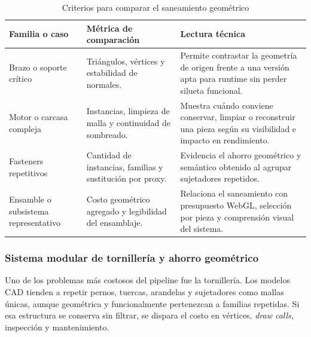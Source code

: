 \begin{table}[p]
    \caption{Criterios para comparar el saneamiento geométrico}
    \label{tab:comparativa_saneamiento_geometrico_cap4}
    \centering
    \footnotesize
    \setlength{\tabcolsep}{3pt}
    \renewcommand{\arraystretch}{0.86}
    \begin{tabular}{>{\RaggedRight\arraybackslash}p{3.2cm}>{\RaggedRight\arraybackslash}p{3.6cm}>{\RaggedRight\arraybackslash}p{6.5cm}}
        \hline
        \textbf{Familia o caso} & \textbf{Métrica de comparación} & \textbf{Lectura técnica} \\ \hline
        Brazo o soporte crítico & Triángulos, vértices y estabilidad de normales. & Permite contrastar la geometría de origen frente a una versión apta para runtime sin perder silueta funcional. \\
        Motor o carcasa compleja & Instancias, limpieza de malla y continuidad de sombreado. & Muestra cuándo conviene conservar, limpiar o reconstruir una pieza según su visibilidad e impacto en rendimiento. \\
        Fasteners repetitivos & Cantidad de instancias, familias y sustitución por proxy. & Evidencia el ahorro geométrico y semántico obtenido al agrupar sujetadores repetidos. \\
        Ensamble o subsistema representativo & Costo geométrico agregado y legibilidad del ensamblaje. & Relaciona el saneamiento con presupuesto WebGL, selección por pieza y comprensión visual del sistema. \\ \hline
    \end{tabular}
    \par\vspace{0.5\baselineskip}
\end{table}

\subsubsection{Sistema modular de tornillería y ahorro geométrico}

Uno de los problemas más costosos del pipeline fue la tornillería. Los modelos CAD tienden a repetir pernos, tuercas, arandelas y sujetadores como mallas únicas, aunque geométrica y funcionalmente pertenezcan a familias repetidas. Si esa estructura se conserva sin filtrar, se dispara el costo en vértices, \textit{draw calls}, inspección y mantenimiento.


